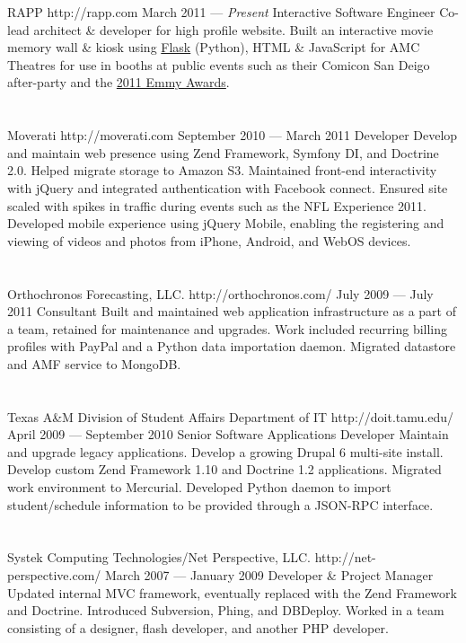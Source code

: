 \documentclass{resume}
\begin{document}
\employer
	{RAPP}
	{http://rapp.com}
	{March 2011 --- \emph{Present}}
	{Interactive Software Engineer}
	{Co-lead architect \& developer for high profile website. Built an interactive movie memory wall \& kiosk using \href{http://flask.pocoo.org/}{Flask} (Python), HTML \& JavaScript for AMC Theatres for use in booths at public events such as their Comicon San Deigo after-party and the \href{http://www.accesshollywood.com/backstage-at-the-emmys/emmys-2011-backstage-at-the-hp-touchsmart-gift-lounge-day-1_gallerytab_3129/20}{2011 Emmy Awards}.}
\\ \\ \\
\employer
	{Moverati}
	{http://moverati.com}
	{September 2010 --- March 2011}
	{Developer}
	{Develop and maintain web presence using Zend Framework, Symfony DI, and Doctrine 2.0. Helped migrate storage to Amazon S3. Maintained front-end interactivity with jQuery and integrated authentication with Facebook connect. Ensured site scaled with spikes in traffic during events such as the NFL Experience 2011. Developed mobile experience using jQuery Mobile, enabling the registering and viewing of videos and photos from iPhone, Android, and WebOS devices.}
\\ \\ \\
\employer
	{Orthochronos Forecasting, LLC.}
	{http://orthochronos.com/}
	{July 2009 --- July 2011}
	{Consultant}
	{Built and maintained web application infrastructure as a part of a team, retained for maintenance and upgrades. Work included recurring billing profiles with PayPal and a Python data importation daemon. Migrated datastore and AMF service to MongoDB.}
\\ \\ \\
\employer
	{Texas A\&M Division of Student Affairs Department of IT}
	{http://doit.tamu.edu/}
	{April 2009 --- September 2010}
	{Senior Software Applications Developer}
	{Maintain and upgrade legacy applications. Develop a growing Drupal 6 multi-site install. Develop custom Zend Framework 1.10 and Doctrine 1.2 applications. Migrated work environment to Mercurial. Developed Python daemon to import student/schedule information to be provided through a JSON-RPC interface.}
\\ \\ \\
\employer
	{Systek Computing Technologies/Net Perspective, LLC.}
	{http://net-perspective.com/}
	{March 2007 --- January 2009}
	{Developer \& Project Manager}
	{Updated internal MVC framework, eventually replaced with the Zend Framework and Doctrine. Introduced Subversion, Phing, and DBDeploy. Worked in a team consisting of a designer, flash developer, and another PHP developer.}
\end{document}
